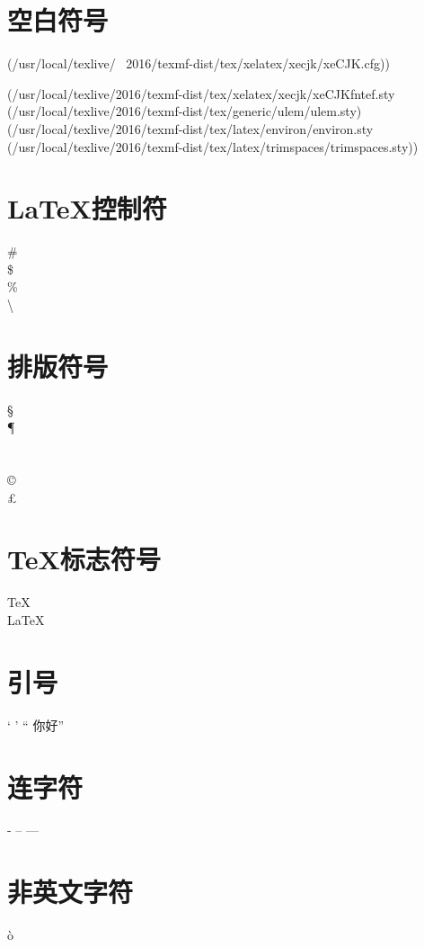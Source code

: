 \documentclass{article}
\begin{document}
	\section{空白符号}%
	(/usr/local/texlive/        \quad   \ 2016/texmf-dist/tex/xelatex/xecjk/xeCJK.cfg))
	
	(/usr/local/texlive/2016/texmf-dist/tex/xelatex/xecjk/xeCJKfntef.sty
	(/usr/local/texlive/2016/texmf-dist/tex/generic/ulem/ulem.sty)
	(/usr/local/texlive/2016/texmf-dist/tex/latex/environ/environ.sty
	(/usr/local/texlive/2016/texmf-dist/tex/latex/trimspaces/trimspaces.sty))

	\section{\LaTeX 控制符}
	\#  \\ \$  \\ \% \\    \textbackslash
	
	\section{排版符号}
	\S \\ \P \\  \dag \\ \ddag \\  \copyright  \\ \pounds
	
	\section{\TeX 标志符号}
	
	\TeX{}  \\ \LaTeX{} \\ \LaTeXe{}
		
	\section{引号}
	`  '    `` 你好''
	
	\section{连字符}
	- -- ---
	
	\section{非英文字符}
	\`o
	
\end{document}
